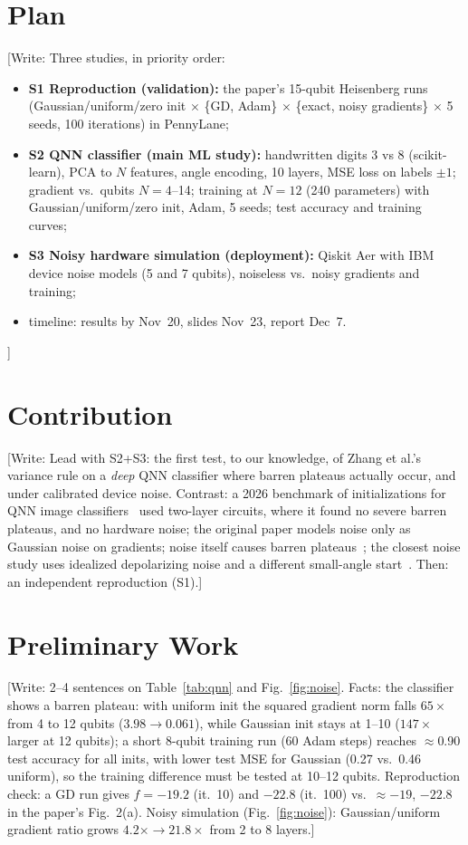 \documentclass[lettersize,journal]{IEEEtran}
\newcommand{\todo}[1]{{\color{red}[Write: #1]}}
\begin{document}
\section{Plan}
\todo{Three studies, in priority order:
\begin{itemize}
\item \textbf{S1 Reproduction (validation):} the paper's 15-qubit Heisenberg runs (Gaussian/uniform/zero init $\times$ \{GD, Adam\} $\times$ \{exact, noisy gradients\} $\times$ 5 seeds, 100 iterations) in PennyLane;
\item \textbf{S2 QNN classifier (main ML study):} handwritten digits 3 vs 8 (scikit-learn), PCA to $N$ features, angle encoding, 10 layers, MSE loss on labels $\pm1$; gradient vs.\ qubits $N=4$--14; training at $N=12$ (240 parameters) with Gaussian/uniform/zero init, Adam, 5 seeds; test accuracy and training curves;
\item \textbf{S3 Noisy hardware simulation (deployment):} Qiskit Aer with IBM device noise models (5 and 7 qubits), noiseless vs.\ noisy gradients and training;
\item timeline: results by Nov~20, slides Nov~23, report Dec~7.
\end{itemize}}

\section{Contribution}
\todo{Lead with S2+S3: the first test, to our knowledge, of Zhang et al.'s variance rule on a \emph{deep} QNN classifier where barren plateaus actually occur, and under calibrated device noise. Contrast: a 2026 benchmark of initializations for QNN image classifiers~\cite{rahman2026benchmarking} used two-layer circuits, where it found no severe barren plateaus, and no hardware noise; the original paper models noise only as Gaussian noise on gradients; noise itself causes barren plateaus~\cite{wang2021noise}; the closest noise study uses idealized depolarizing noise and a different small-angle start~\cite{shen2026initialization}. Then: an independent reproduction (S1).}

\section{Preliminary Work}
\todo{2--4 sentences on Table~\ref{tab:qnn} and Fig.~\ref{fig:noise}. Facts: the classifier shows a barren plateau: with uniform init the squared gradient norm falls $65\times$ from 4 to 12 qubits ($3.98\to0.061$), while Gaussian init stays at 1--10 ($147\times$ larger at 12 qubits); a short 8-qubit training run (60 Adam steps) reaches $\approx$0.90 test accuracy for all inits, with lower test MSE for Gaussian (0.27 vs.\ 0.46 uniform), so the training difference must be tested at 10--12 qubits. Reproduction check: a GD run gives $f=-19.2$ (it.~10) and $-22.8$ (it.~100) vs.\ $\approx-19$, $-22.8$ in the paper's Fig.~2(a). Noisy simulation (Fig.~\ref{fig:noise}): Gaussian/uniform gradient ratio grows $4.2\times\to21.8\times$ from 2 to 8 layers.}
\end{document}

